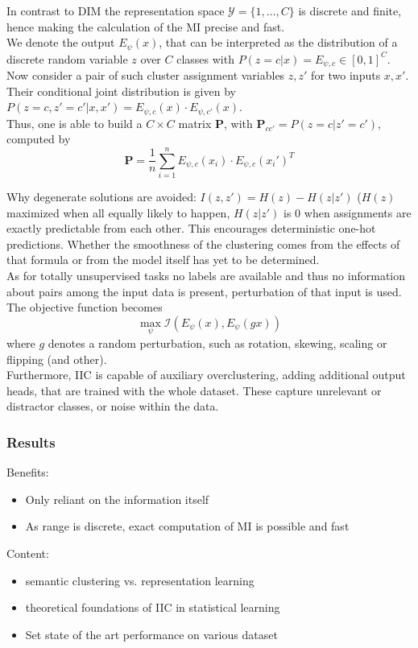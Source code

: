 \documentclass[]{article}
\begin{document}
In contrast to DIM the representation space $\mathcal{Y} = \{1,\dots,C\}$ is discrete and finite, hence making the calculation of the MI precise and fast. \\ 

We denote the output $E_\psi(x)$, that can be interpreted as the distribution of a discrete random variable $z$ over $C$ classes with $P(z=c|x) = E_{\psi,c} \in [0,1]^C$.\\
Now consider a pair of such  cluster assignment variables $z, z'$ for two inputs $x,x'$. Their conditional joint distribution is given by $P(z=c, z'=c'|x,x') = E_{\psi,c}(x) \cdot E_{\psi,c'}(x)$.\\

Thus, one is able to build a $C\times C$ matrix $\mathbf{P}$, with $\mathbf{P}_{cc'} = P(z=c|z'=c')$, computed by
\begin{equation}
	\mathbf{P} = \frac{1}{n}\sum_{i=1}^{n}E_{\psi,c}(x_i) \cdot E_{\psi,c}(x_i')^T
\end{equation}

Why degenerate solutions are avoided: $I(z,z') = H(z) - H(z|z')$ ($H(z)$ maximized when all equally likely to happen, $H(z|z')$ is $0$ when assignments are exactly predictable from each other. This encourages deterministic one-hot predictions. Whether the smoothness of the clustering comes from the effects of that formula or from the model itself has yet to be determined.\\

As for totally unsupervised tasks no labels are available and thus no information about pairs among the input data is present, perturbation of that input is used. The objective function becomes
\begin{equation}
\max_\psi\mathcal{I}(E_\psi(x),E_\psi(gx))
\end{equation}
where $g$ denotes a random perturbation, such as rotation, skewing, scaling or flipping (and other).\\

Furthermore, IIC is capable of auxiliary overclustering, adding additional output heads, that are trained with the whole dataset. These capture unrelevant or distractor classes, or noise within the data.\\

\subsubsection{Results}
Benefits:
\begin{itemize}
	\item Only reliant on the information itself
	\item As range is discrete, exact computation of MI is possible and fast
\end{itemize}

Content:
\begin{itemize}
	\item semantic clustering vs. representation learning
	\item theoretical foundations of IIC in statistical learning
\end{itemize}
\begin{itemize}
	\item Set state of the art performance on various dataset
\end{itemize}
\end{document}
